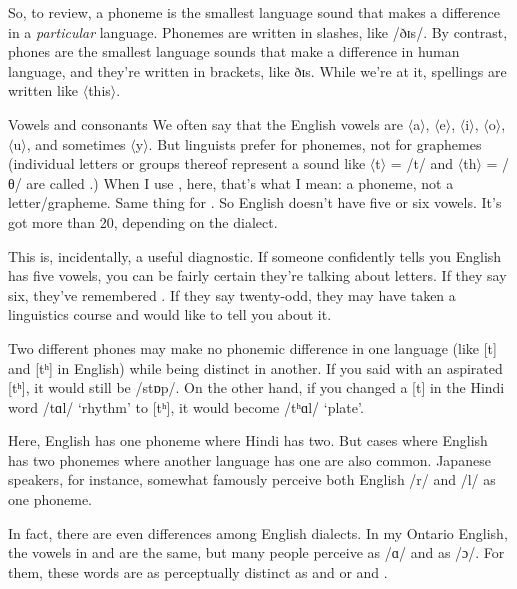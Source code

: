 So, to review, a phoneme is the smallest language sound that makes a difference in a \emph{particular} language. Phonemes are written in slashes, like /ðɪs/. By contrast, phones are the smallest language sounds that make a difference in human language, and they're written in brackets, like \ob ðɪs{\cb}. While we're at it, spellings are written like $\langle$this$\rangle$.


\begin{tblsframed}{Vowels and consonants} \label{sec:vowels-and-consonants}
    We often say that the English vowels are $\langle$a$\rangle$, $\langle$e$\rangle$, $\langle$i$\rangle$, $\langle$o$\rangle$, $\langle$u$\rangle$, and sometimes $\langle$y$\rangle$. But linguists prefer  for phonemes, not for graphemes (individual letters or groups thereof represent a sound like $\langle$t$\rangle$ = /t/ and $\langle$th$\rangle$ = /θ/ are called .) When I use , here, that's what I mean: a phoneme, not a letter/grapheme. Same thing for . So English doesn't have five or six vowels. It's got more than 20, depending on the dialect.

This is, incidentally, a useful diagnostic. If someone confidently tells you English has five vowels, you can be fairly certain they're talking about letters. If they say six, they've remembered . If they say twenty-odd, they may have taken a linguistics course and would like to tell you about it.
\end{tblsframed}

Two different phones may make no phonemic difference in one language (like [t] and [tʰ] in English) while being distinct in another. If you said  with an aspirated [tʰ], it would still be /stɒp/. On the other hand, if you changed a [t] in the Hindi word /tɑl/ `rhythm' to [tʰ], it would become /tʰɑl/ `plate'.

Here, English has one phoneme where Hindi has two. But cases where English has two phonemes where another language has one are also common. Japanese speakers, for instance, somewhat famously perceive both English /r/ and /l/ as one phoneme.

In fact, there are even differences among English dialects. In my Ontario English, the vowels in  and  are the same, but many people perceive  as /ɑ/ and  as /ɔ/. For them, these words are as perceptually distinct as  and  or  and .

